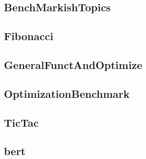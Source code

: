 
\newpage
\subsection{BenchMarkishTopics}
    \begin{figure}[h]
	    \centering
		
	\end{figure}
    


\newpage
\subsection{Fibonacci}
    \begin{figure}[h]
	    \centering
		
	\end{figure}
    


\newpage
\subsection{GeneralFunctAndOptimize}
    \begin{figure}[h]
	    \centering
		
	\end{figure}
    


\newpage
\subsection{OptimizationBenchmark}
    \begin{figure}[h]
	    \centering
		
	\end{figure}
    


\newpage
\subsection{TicTac}
    \begin{figure}[h]
	    \centering
		
	\end{figure}
    


\newpage
\subsection{bert}
    \begin{figure}[h]
	    \centering
		
	\end{figure}
    


